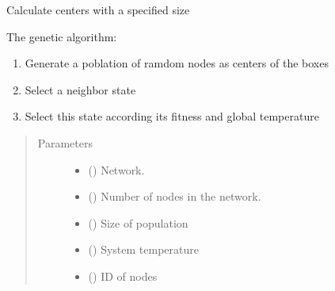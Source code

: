 \documentclass[letterpaper,10pt,english]{sphinxmanual}
\begin{document}
\begin{fulllineitems}
\label{\detokenize{SimulatedAnnealing:SimulatedAnnealing.SimulatedAnnealing.calculateCenters}}
Calculate centers with a specified size

The genetic algorithm:
\begin{enumerate}
\def\theenumi{\arabic{enumi}}
\def\labelenumi{\theenumi .}
\makeatletter\def\p@enumii{\p@enumi \theenumi .}\makeatother
\item {} 
Generate a poblation of ramdom nodes as centers of the boxes

\item {} 
Select a neighbor state

\item {} 
Select this state according its fitness and global temperature

\end{enumerate}
\begin{quote}\begin{description}
\item[{Parameters}] \leavevmode\begin{itemize}
\item {} 
 () \textendash{} Network.

\item {} 
 () \textendash{} Number of nodes in the network.

\item {} 
 () \textendash{} Size of population

\item {} 
 () \textendash{} System temperature

\item {} 
 () \textendash{} ID of nodes


\end{itemize}
\end{description}
\end{quote}
\end{fulllineitems}
\end{document}

